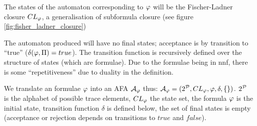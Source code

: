 The states of the automaton corresponding to $\varphi$ will be the
Fischer-Ladner closure $CL_\varphi$, a generalisation of subformula closure (see figure \ref{fig:fisher_ladner_closure})


The automaton produced will have no final states; acceptance is by
transition to ``true'' ($\delta(\varphi,\Pi)=true$).
The transition function is recursively defined over the structure of states
(which are formulae).
Due to the formulae being in nnf, there is some ``repetitiveness'' due to duality
in the definition.
{\newcommand{\autphi}{\mathcal{A}_\vphi}

We translate an \ldlf formulae $\varphi$ into an AFA $\autphi$
thus:
$ \autphi = (2^\prop, CL_\vphi, \vphi, \delta, \set{})$.
$2^{\mathcal{P}}$ is the alphabet of possible trace elements,
$CL_\varphi$ the state set, the formula $\varphi$ is the initial state,
transition function $\delta$ is defined below,
the set of final states is empty (acceptance or rejection depends on
transitions to $true$ and $false$).



}
